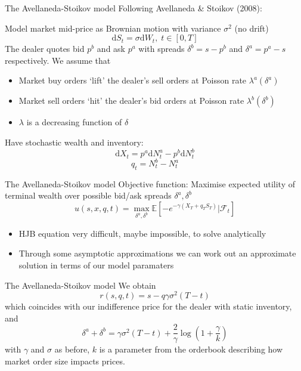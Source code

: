 \documentclass{beamer} %
\begin{document}
\begin{frame}{The Avellaneda-Stoikov model}
    Following Avellaneda \& Stoikov (2008):

    Model market mid-price as Brownian motion with variance $\sigma^2$ (no drift)
    $$\mathrm d S_t=\sigma \mathrm d W_t,\;t\in[0,T]$$
    The dealer quotes bid $p^b$ and ask $p^a$ with spreads $\delta^b=s-p^b$ and $\delta^a=p^a-s$
    respectively.
    We assume that 
    \begin{itemize}
        \item Market buy orders `lift' the dealer's sell orders at Poisson rate $\lambda^a(\delta^a)$
        \item Market sell orders `hit' the dealer's bid orders at Poisson rate $\lambda^b(\delta^b)$
        \item $\lambda$ is a decreasing function of $\delta$
    \end{itemize}
    Have stochastic wealth and inventory:
    \begin{equation}
        \mathrm dX_t=p^a\mathrm dN_t^a-p^b\mathrm dN_t^b
    \end{equation}
    \begin{equation}
        q_t=N_t^b-N_t^a
    \end{equation}
\end{frame}

\begin{frame}{The Avellaneda-Stoikov model}
    Objective function: Maximise expected utility of terminal wealth over possible bid/ask spreads $\delta^a,\delta^b$
    \begin{equation}
        u(s,x,q,t)=\max_{\delta^a,\delta^b}\mathbb{E}\left[-e^{-\gamma(X_T+q_TS_T)}|\mathcal{F}_t\right]
    \end{equation}
    \begin{itemize}
        \item HJB equation very difficult, maybe impossible, to solve analytically
        \item Through some asymptotic approximations we can work out an approximate solution in terms of our model paramaters
    \end{itemize}
\end{frame}

\begin{frame}{The Avellaneda-Stoikov model}
    We obtain
    \begin{equation}
        r(s,q,t)=s-q\gamma\sigma^2(T-t)
    \end{equation}
    which coincides with our indifference price for the dealer with static inventory, and
    \begin{equation}
        \delta^a+\delta^b=\gamma\sigma^2(T-t)+\frac{2}{\gamma}\log\left(1+\frac{\gamma}{k}\right)
    \end{equation}
    with $\gamma$ and $\sigma$ as before, $k$ is a parameter from the orderbook describing how 
    market order size impacts prices.
\end{frame}
\end{document}
